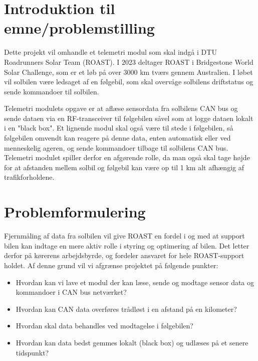 \documentclass[]{article}
\begin{document}
 \section*{Introduktion til emne/problemstilling}

Dette projekt vil omhandle et telemetri modul som skal indgå i DTU Roadrunners Solar Team (ROAST). I 2023 deltager ROAST i Bridgestone World Solar Challenge, som er et løb på over 3000 km tværs gennem Australien. I løbet vil solbilen være ledsaget af en følgebil, som skal overvåge solbilens driftstatus og sende kommandoer til solbilen.


Telemetri modulets opgave er at aflæse sensordata fra solbilens CAN bus og sende dataen via en RF-transceiver til følgebilen såvel som at logge dataen lokalt i en "black box". Et lignende modul skal også være til stede i følgebilen, så følgebilen omvendt kan reagere på denne data, enten automatisk eller ved menneskelig ageren, og sende kommandoer tilbage til solbilens CAN bus. Telemetri modulet spiller derfor en afgørende rolle, da man også skal tage højde for at afstanden mellem solbil og følgebil kan være op til 1 km alt afhængig af trafikforholdene.

\section*{Problemformulering}
Fjernmåling af data fra solbilen vil give ROAST en fordel i og med at support bilen kan indtage en mere aktiv rolle i styring og optimering af bilen. Det letter derfor på kørerens arbejdsbyrde, og fordeler ansvaret for hele ROAST-support holdet. Af denne grund vil vi afgrænse projektet på følgende punkter: 
\begin{itemize}
    \item Hvordan kan vi lave et modul der kan læse, sende og modtage sensor data og kommandoer i CAN bus netværket?
    \item Hvordan kan CAN data overføres trådløst i en afstand på en kilometer?
    \item Hvordan skal data behandles ved modtagelse i følgebilen?
    \item Hvordan kan data bedst gemmes lokalt (black box) og udlæses på et senere tidspunkt?
\end{itemize}
\end{document}
